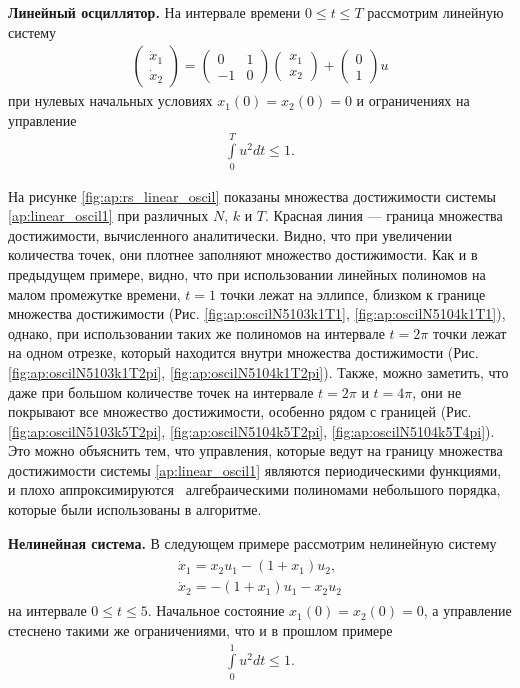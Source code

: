 \documentclass[../main.tex]{subfiles}
\begin{document}
 \textbf{Линейный осциллятор.} На интервале времени $ 0 \leqslant t \leqslant T$ рассмотрим линейную систему 
 \begin{gather}\label{ap:linear_oscil1}
 	\begin{pmatrix} 
 		\dot{x}_1 \\
 		\dot{x}_2 
 	\end{pmatrix} = 
 	\begin{pmatrix}
 		0 & 1 \\
 		-1 & 0
 	\end{pmatrix}
 	\begin{pmatrix} 
 		x_1 \\
 		x_2 
 	\end{pmatrix} +
 	\begin{pmatrix} 0 \\ 1
 	\end{pmatrix} u
 \end{gather}
 при нулевых начальных условиях $x_1(0) = x_2(0) = 0 $ и ограничениях на управление 
 \begin{gather*}
 	\int\limits_0^T u^2dt \leqslant 1.
 \end{gather*}
 
 На рисунке \ref{fig:ap:rs_linear_oscil} показаны множества достижимости системы \eqref{ap:linear_oscil1} при различных $N$, $k$ и $T$.
 Красная линия --- граница множества достижимости, вычисленного аналитически.
 Видно, что при увеличении количества точек, они плотнее заполняют множество достижимости.
 Как и в предыдущем примере, видно, что при использовании линейных полиномов на малом промежутке времени, $t = 1$ точки лежат на эллипсе, близком к границе множества достижимости (Рис. \ref{fig:ap:oscilN5103k1T1}, \ref{fig:ap:oscilN5104k1T1}), однако, при использовании таких же полиномов на интервале $t = 2\pi$ точки лежат на одном отрезке, который находится внутри множества достижимости (Рис. \ref{fig:ap:oscilN5103k1T2pi}, \ref{fig:ap:oscilN5104k1T2pi}). 
 Также, можно заметить, что даже при большом количестве точек на интервале $t = 2\pi$ и $t = 4\pi$, они не покрывают все множество достижимости, особенно рядом с границей (Рис. \ref{fig:ap:oscilN5103k5T2pi}, \ref{fig:ap:oscilN5104k5T2pi}, \ref{fig:ap:oscilN5104k5T4pi}). 
 Это можно объяснить тем, что управления, которые ведут на границу множества достижимости системы \eqref{ap:linear_oscil1} являются периодическими функциями, и плохо аппроксимируются  алгебраическими полиномами небольшого порядка, которые были использованы в алгоритме.
 
  \textbf{Нелинейная система.} В следующем примере рассмотрим нелинейную систему 
  \begin{gather}\label{ap:nonlinear_system1}
  	\begin{gathered}
  	\dot{x}_1 = x_2 u_1 - (1 + x_1) u_2,\\
  	\dot{x}_2 = -(1 + x_1) u_1 - x_2 u_2
  	\end{gathered}
  \end{gather}
  на интервале $ 0 \leqslant t \leqslant 5$.
  Начальное состояние $x_1(0) = x_2(0) = 0 $, а управление стеснено такими же ограничениями, что и в прошлом примере
  \begin{gather*}
  	\int\limits_0^1 u^2dt \leqslant 1.
  \end{gather*}
  
\end{document}
